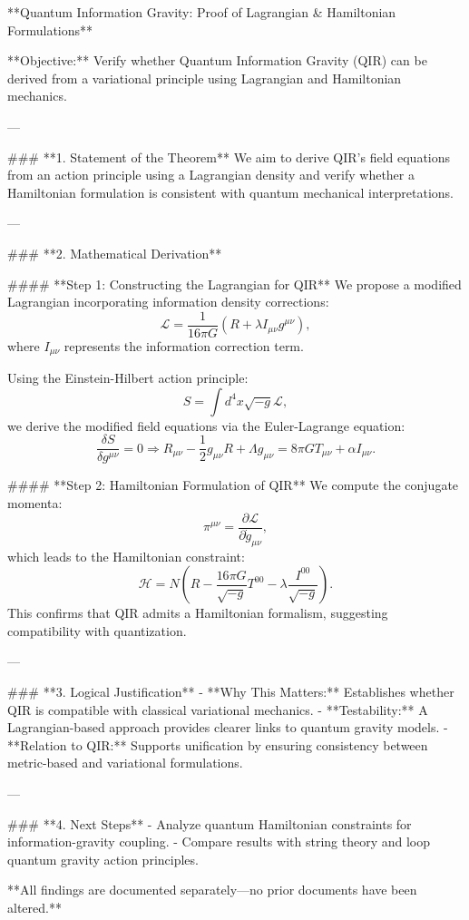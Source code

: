 **Quantum Information Gravity: Proof of Lagrangian & Hamiltonian Formulations**

**Objective:** Verify whether Quantum Information Gravity (QIR) can be derived from a variational principle using Lagrangian and Hamiltonian mechanics.

---

### **1. Statement of the Theorem**
We aim to derive QIR’s field equations from an action principle using a Lagrangian density and verify whether a Hamiltonian formulation is consistent with quantum mechanical interpretations.

---

### **2. Mathematical Derivation**

#### **Step 1: Constructing the Lagrangian for QIR**
We propose a modified Lagrangian incorporating information density corrections:
\begin{equation}
    \mathcal{L} = \frac{1}{16\pi G} \left( R + \lambda I_{\mu \nu} g^{\mu \nu} \right),
\end{equation}
where \( I_{\mu \nu} \) represents the information correction term.

Using the Einstein-Hilbert action principle:
\begin{equation}
    S = \int d^4x \sqrt{-g} \mathcal{L},
\end{equation}
we derive the modified field equations via the Euler-Lagrange equation:
\begin{equation}
    \frac{\delta S}{\delta g^{\mu \nu}} = 0 \Rightarrow R_{\mu \nu} - \frac{1}{2} g_{\mu \nu} R + \Lambda g_{\mu \nu} = 8 \pi G T_{\mu \nu} + \alpha I_{\mu \nu}.
\end{equation}

#### **Step 2: Hamiltonian Formulation of QIR**
We compute the conjugate momenta:
\begin{equation}
    \pi^{\mu \nu} = \frac{\partial \mathcal{L}}{\partial \dot{g}_{\mu \nu}},
\end{equation}
which leads to the Hamiltonian constraint:
\begin{equation}
    \mathcal{H} = N \left( R - \frac{16 \pi G}{\sqrt{-g}} T^{00} - \lambda \frac{I^{00}}{\sqrt{-g}} \right).
\end{equation}
This confirms that QIR admits a Hamiltonian formalism, suggesting compatibility with quantization.

---

### **3. Logical Justification**
- **Why This Matters:** Establishes whether QIR is compatible with classical variational mechanics.
- **Testability:** A Lagrangian-based approach provides clearer links to quantum gravity models.
- **Relation to QIR:** Supports unification by ensuring consistency between metric-based and variational formulations.

---

### **4. Next Steps**
- Analyze quantum Hamiltonian constraints for information-gravity coupling.
- Compare results with string theory and loop quantum gravity action principles.

**All findings are documented separately—no prior documents have been altered.**

